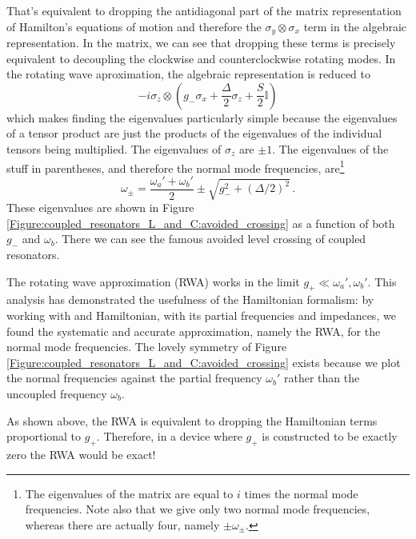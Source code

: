 \documentclass{article}
\begin{document}
That's equivalent to dropping the antidiagonal part of the matrix representation of Hamilton's equations of motion and therefore the $\sigma_y \otimes \sigma_x$ term in the algebraic representation.
In the matrix, we can see that dropping these terms is precisely equivalent to decoupling the clockwise and counterclockwise rotating modes.
In the rotating wave aproximation, the algebraic representation is reduced to
\begin{equation*}
  -i \sigma_z \otimes \left(
    g_- \sigma_x + \frac{\Delta}{2} \sigma_z + \frac{S}{2} \mathbb{I}
  \right)
\end{equation*}
which makes finding the eigenvalues particularly simple because the eigenvalues of a tensor product are just the products of the eigenvalues of the individual tensors being multiplied.
The eigenvalues of $\sigma_z$ are $\pm 1$.
The eigenvalues of the stuff in parentheses, and therefore the normal mode frequencies, are\footnote{The eigenvalues of the matrix are equal to $i$ times the normal mode frequencies. Note also that we give only two normal mode frequencies, whereas there are actually four, namely $\pm \omega_\pm$.}
\begin{equation}
  \omega_\pm
  = \frac{\omega_a' + \omega_b'}{2} \pm \sqrt{g_-^2 + (\Delta / 2)^2 } \, .
\end{equation}
These eigenvalues are shown in Figure \ref{Figure:coupled_resonators_L_and_C:avoided_crossing} as a function of both $g_-$ and $\omega_b$.
There we can see the famous avoided level crossing of coupled resonators.

The rotating wave approximation (RWA) works in the limit $g_+ \ll \omega_a', \omega_b'$.
This analysis has demonstrated the usefulness of the Hamiltonian formalism: by working with and Hamiltonian, with its partial frequencies and impedances, we found the systematic and accurate approximation, namely the RWA, for the normal mode frequencies.
The lovely symmetry of Figure \ref{Figure:coupled_resonators_L_and_C:avoided_crossing} exists because we plot the normal frequencies against the partial frequency $\omega_b'$ rather than the uncoupled frequency $\omega_b$.

As shown above, the RWA is equivalent to dropping the Hamiltonian terms proportional to $g_+$.
Therefore, in a device where $g_+$ is constructed to be exactly zero the RWA would be exact!
\end{document}

